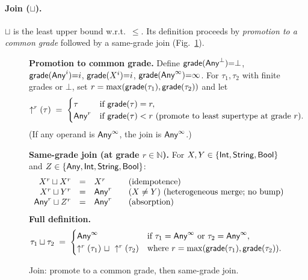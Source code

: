 \paragraph{Join (\texorpdfstring{$\sqcup$}{sqcup}).}
$\sqcup$ is the least upper bound w.r.t.\ $\le$.
Its definition proceeds by \emph{promotion to a common grade} followed by a same-grade join (Fig.~\ref{fig:join}).

\begin{figure}[t]
\centering
\textbf{Promotion to common grade.}
Define $\mathsf{grade}(\mathsf{Any}^{\bot}){=}\bot$, $\mathsf{grade}(\mathsf{Any}^{i}){=}i$, $\mathsf{grade}(X^{i}){=}i$, $\mathsf{grade}(\mathsf{Any}^{\infty}){=}\infty$.
For $\tau_1,\tau_2$ with finite grades or $\bot$, set $r=\max(\mathsf{grade}(\tau_1),\mathsf{grade}(\tau_2))$ and let
\[
\uparrow^{r}(\tau) \;=\;
\begin{cases}
\tau & \text{if } \mathsf{grade}(\tau)=r,\\
\mathsf{Any}^{r} & \text{if } \mathsf{grade}(\tau)<r\text{ (promote to least supertype at grade $r$).}
\end{cases}
\]
(If any operand is $\mathsf{Any}^{\infty}$, the join is $\mathsf{Any}^{\infty}$.)

\medskip
\textbf{Same-grade join (at grade $r\in\mathbb{N}$).}
For $X,Y\in\{\mathsf{Int},\mathsf{String},\mathsf{Bool}\}$ and $Z\in\{\mathsf{Any},\mathsf{Int},\mathsf{String},\mathsf{Bool}\}$:
\[
\begin{array}{r@{\quad=\quad}l@{\qquad}l}
X^{r} \sqcup X^{r} & X^{r} & \text{(idempotence)}\\
X^{r} \sqcup Y^{r} & \Any^{r} & (X\neq Y)\ \text{(heterogeneous merge; no bump)}\\
\Any^{r} \sqcup Z^{r} & \Any^{r} & \text{(absorption)}\\
\end{array}
\]
\medskip
\textbf{Full definition.}
\[
\tau_1 \sqcup \tau_2 \;=\;
\begin{cases}
\mathsf{Any}^{\infty} & \text{if }\tau_1=\mathsf{Any}^{\infty}\text{ or }\tau_2=\mathsf{Any}^{\infty},\\
\uparrow^{r}(\tau_1)\ \sqcup\ \uparrow^{r}(\tau_2) & \text{where } r=\max(\mathsf{grade}(\tau_1),\mathsf{grade}(\tau_2)).
\end{cases}
\]
\vspace{-1mm}
\caption{Join: promote to a common grade, then same-grade join.}
\label{fig:join}
\end{figure}


